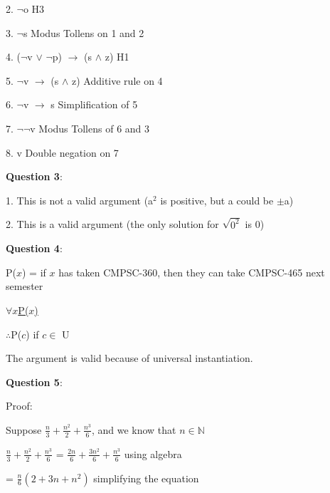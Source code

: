 \documentclass{article} %
\newcommand{\question}[2][]{\begin{flushleft}
        \textbf{Question #1}: \textit{#2}

\end{flushleft}}
\begin{document}
    2. $\neg$o \tabto*{5cm}H3

    3. $\neg$s \tabto*{5cm}Modus Tollens on 1 and 2

    4. ($\neg$v $\lor$ $\neg$p) $\rightarrow$ (s $\land$ z) \tabto*{5cm}H1
    
    5. $\neg$v $\rightarrow$ (s $\land$ z) \tabto*{5cm}Additive rule on 4

    6. $\neg$v $\rightarrow$ s \tabto*{5cm}Simplification of 5

    7. $\neg \neg$v \tabto*{5cm}Modus Tollens of 6 and 3

    8. v \tabto*{5cm}Double negation on 7

    \question[3]{}

    1. This is not a valid argument (a$^2$ is positive, but a could be $\pm$a)
    
    2. This is a valid argument (the only solution for $\sqrt{0^2}$ is 0)

    \question[4]{}

    P($x$) = if $x$ has taken CMPSC-360, then they can take CMPSC-465 next semester

    \hspace*{0cm}

    \underline{$\forall x$P($x$) \phantom{aaaaaa}}

    $\therefore$P($c$) if $c \in $ U

    \hspace*{0cm}

    The argument is valid because of universal instantiation.

    \newpage




    \question[5]{}


    Proof:

    Suppose $\frac{n}{3} + \frac{n^2}{2} + \frac{n^3}{6}$, and we know that $n \in \mathbb{N}$

    $\frac{n}{3} + \frac{n^2}{2} + \frac{n^3}{6}$ = $\frac{2n}{6} + \frac{3n^2}{6} + \frac{n^3}{6}$ \tabto*{6cm}using algebra
    
    \vspace*{0.08cm}

    \tabto*{2.57cm} = $\frac{n}{6}(2 + 3n + n^2)$ \tabto*{6cm}simplifying the equation

    \vspace*{0.08cm}
\end{document}

